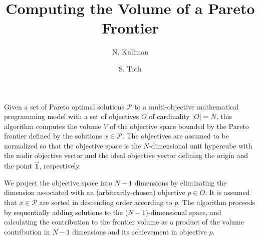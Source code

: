 \documentclass[11pt,letterpaper]{article}
\begin{document}
\title{Computing the Volume of a Pareto Frontier}
\author{N. Kullman \and S. Toth}
\maketitle



Given a set of Pareto optimal solutions $\mathcal{P}$ to a multi-objective mathematical programming model with a set of objectives $O$ of cardinality $|O| = N$, this algorithm computes the volume $V$ of the objective space bounded by the Pareto frontier defined by the solutions $x \in \mathcal{P}$. The objectives are assumed to be normalized so that the objective space is the $N$-dimensional unit hypercube with the nadir objective vector and the ideal objective vector defining the origin and the point $\vec{\mathbf{1}}$, respectively.

We project the objective space into $N-1$ dimensions by eliminating the dimension associated with an (arbitrarily-chosen) objective $p \in O$. It is assumed that $x \in \mathcal{P}$ are sorted in descending order according to $p$. The algorithm proceeds by sequentially adding solutions to the ($N-1$)-dimensional space, and calculating the contribution to the frontier volume as a product of the volume contribution in $N-1$ dimensions and its achievement in objective $p$.
\end{document}
